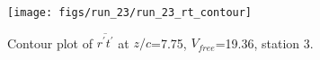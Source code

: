 \begin{figure}[H]
\centering
\texttt{[image: figs/run\_23/run\_23\_rt\_contour]}
\caption{Contour plot of $\overline{r^\prime t^\prime}$ at $z/c$=7.75, $V_{free}$=19.36, station 3.}
\label{fig:run_23_rt_contour}
\end{figure}


